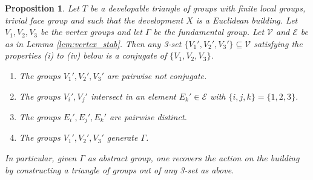 \documentclass[dvipsnames]{article}
\newtheorem{proposition}[theorem]{Proposition}
\theoremstyle{definition}
\theoremstyle{remark}
\begin{document}
    \begin{proposition}\label{prop:recover}
        Let $T$ be a developable triangle of groups with finite local groups, trivial face group and such that the development $X$ is a Euclidean building.
        Let $V_1, V_2, V_3$ be the vertex groups and let $\Gamma$ be the fundamental group.
        Let $\mathcal V$ and $\mathcal E$ be as in Lemma \ref{lem:vertex_stab}.     
        Then any 3-set $\{V_1',V_2',V_3'\} \subseteq \mathcal V$ satisfying the properties (i) to (iv) below is a conjugate of $\{V_1, V_2, V_3\}$. 
        \begin{enumerate}[label=(\roman*)]
            \item The groups $V_1', V_2', V_3'$ are pairwise not conjugate.
            \item The groups $V_i',V_j'$ intersect in an element $E_k' \in \mathcal E$ with $\{i,j,k\} = \{1,2,3\}$.
            \item The groups $E_i',E_j', E_k'$ are pairwise distinct.
            \item The groups $V_1',V_2', V_3'$ generate $\Gamma$.
        \end{enumerate}
        In particular, given $\Gamma$ as abstract group, one recovers the action on the building by constructing a triangle of groups out of any 3-set as above.
    \end{proposition}
    
\end{document}
